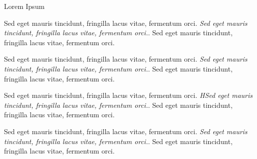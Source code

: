 \documentclass[UKenglish, aspectratio = 169]{beamer}
\begin{document}
\begin{frame}[allowframebreaks]{Lorem Ipsum}

    \begin{thebibliography}{}

        Sed eget mauris tincidunt, fringilla lacus vitae, fermentum orci.
        \newblock \emph{Sed eget mauris tincidunt, fringilla lacus vitae, fermentum orci.}.
        \newblock  Sed eget mauris tincidunt, fringilla lacus vitae, fermentum orci.
        
        Sed eget mauris tincidunt, fringilla lacus vitae, fermentum orci.
        \newblock \emph{Sed eget mauris tincidunt, fringilla lacus vitae, fermentum orci.}.
        \newblock   Sed eget mauris tincidunt, fringilla lacus vitae, fermentum orci.
        
        Sed eget mauris tincidunt, fringilla lacus vitae, fermentum orci.
        \newblock \emph{HSed eget mauris tincidunt, fringilla lacus vitae, fermentum orci.}.
        \newblock   Sed eget mauris tincidunt, fringilla lacus vitae, fermentum orci.
        
        Sed eget mauris tincidunt, fringilla lacus vitae, fermentum orci.
        \newblock \emph{Sed eget mauris tincidunt, fringilla lacus vitae, fermentum orci.}.
        \newblock   Sed eget mauris tincidunt, fringilla lacus vitae, fermentum orci.

    \end{thebibliography}
\end{frame}
\end{document}
